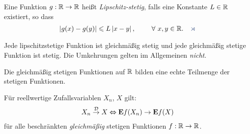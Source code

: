 \begin{defnn}
Eine Funktion $g:\mathbb{R}\to\mathbb{R}$ heißt \emph{Lipschitz-stetig}, falls eine Konstante
$L\in\mathbb{R}$ existiert, so dass
\begin{align*}
\abs{g(x)-g(y)} \le L\abs{x-y},\qquad \forall x,y\in\R.\fishhere
\end{align*}
\end{defnn} 
Jede lipschitzstetige Funktion ist gleichmäßig stetig und jede gleichmäßig
stetige Funktion ist stetig. Die Umkehrungen gelten im Allgemeinen
\textit{nicht}.

Die gleichmäßig stetigen Funktionen auf $\mathbb{R}$ bilden eine echte Teilmenge der
stetigen Funktionen.

\begin{prop}
\label{prop:9.9}
Für reellwertige Zufallsvariablen $X_n$, $X$ gilt:
\begin{align*}
X_n \overset{\mathcal{D}}{\to} X \Leftrightarrow \textbf{E} f(X_n) \to \textbf{E} f(X)
\end{align*}
für alle beschränkten \textit{gleichmäßig} stetigen Funktionen
$f:\mathbb{R}\to\mathbb{R}$.\fishhere
\end{prop} 
